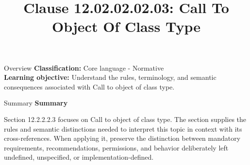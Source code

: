 \documentclass[10pt,letterpaper]{article}
\title{Clause 12.02.02.02.03: Call To Object Of Class Type}
\author{}
\date{}
\begin{document}
\maketitle
\begin{CornellOverviewBox}{Overview}
\textbf{Classification:} Core language - Normative\\[2pt]
\textbf{Learning objective:} Understand the rules, terminology, and semantic consequences associated with Call to object of class type.
\end{CornellOverviewBox}\begin{CornellSummaryBox}{Summary}
{\sffamily\bfseries\color{Accent} Summary}\par\vspace{3pt}Section 12.2.2.2.3 focuses on Call to object of class type. The section supplies the rules and semantic distinctions needed to interpret this topic in context with its cross-references. When applying it, preserve the distinction between mandatory requirements, recommendations, permissions, and behavior deliberately left undefined, unspecified, or implementation-defined.
\end{CornellSummaryBox}
\end{document}
